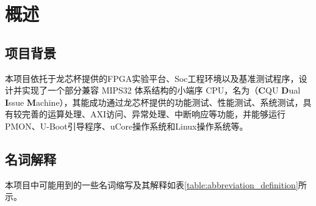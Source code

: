 \chapter{概述}

\section{项目背景}
本项目依托于龙芯杯提供的FPGA实验平台、Soc工程环境以及基准测试程序，设计并实现了一个部分兼容 MIPS32 体系结构的小端序 CPU，名为\cpuname（\textbf{C}QU \textbf{D}ual \textbf{I}ssue \textbf{M}achine），其能成功通过龙芯杯提供的功能测试、性能测试、系统测试，具有较完善的运算处理、AXI访问、异常处理、中断响应等功能，并能够运行PMON、U-Boot引导程序、uCore操作系统和Linux操作系统等。

\section{名词解释}
本项目中可能用到的一些名词缩写及其解释如表\ref{table:abbreviation_definition}所示。

